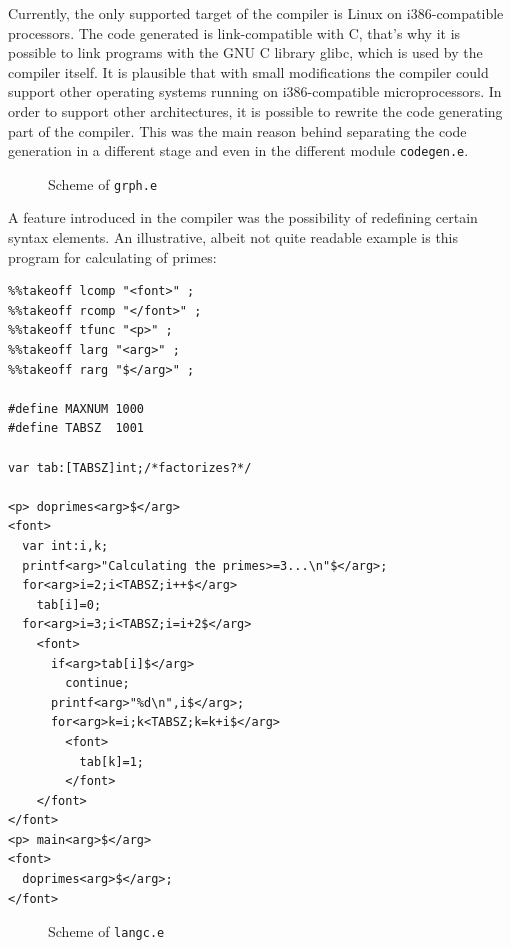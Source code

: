 \documentclass[10pt]{article}
\def\n{\nu}
\begin{document}
Currently, the only supported target of the compiler is Linux on
\textsf{i386}-compatible processors. The code generated is
link-compatible with C, 
that's why it is possible to link programs with the GNU C library
\textsf{glibc}, which is used by the compiler itself. It is plausible
that with small modifications the compiler could support other operating
systems running on \textsf{i386}-compatible microprocessors. In order to
support other architectures, it is possible to rewrite the code
generating part of the compiler. This was the main reason behind
separating the code generation in a different stage and even in the
different module \texttt{codegen.e}.

\begin{figure}[h]
\begin{center}
\textwidth
{}
\end{center}
\caption{Scheme of \texttt{grph.e}}
\label{lfig1}
\end{figure}

A feature introduced in the compiler was the possibility of redefining
certain syntax elements. An illustrative, albeit not quite readable
example is this program for calculating of primes:
\begin{verbatim}
%%takeoff lcomp "<font>" ;
%%takeoff rcomp "</font>" ;
%%takeoff tfunc "<p>" ;
%%takeoff larg "<arg>" ;
%%takeoff rarg "$</arg>" ;

#define MAXNUM 1000
#define TABSZ  1001

var tab:[TABSZ]int;/*factorizes?*/

<p> doprimes<arg>$</arg>
<font>
  var int:i,k;
  printf<arg>"Calculating the primes>=3...\n"$</arg>;
  for<arg>i=2;i<TABSZ;i++$</arg>
    tab[i]=0;
  for<arg>i=3;i<TABSZ;i=i+2$</arg>
    <font>
      if<arg>tab[i]$</arg>
        continue;
      printf<arg>"%d\n",i$</arg>;
      for<arg>k=i;k<TABSZ;k=k+i$</arg>
        <font>
          tab[k]=1;
        </font>
    </font>
</font>
<p> main<arg>$</arg>
<font>
  doprimes<arg>$</arg>;
</font>
\end{verbatim}
\begin{figure}[h]
\begin{center}
\textwidth
{}
\end{center}
\caption{Scheme of \texttt{langc.e}}
\label{lfig2}
\end{figure}
\end{document}
